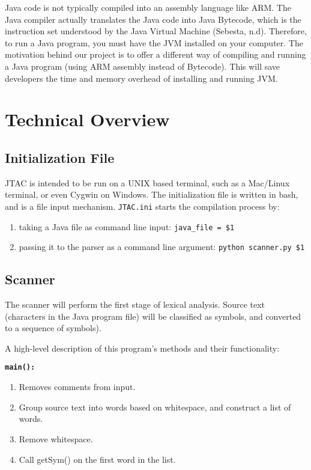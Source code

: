 \documentclass[11pt]{article}
\begin{document}
\bigskip
Java code is not typically compiled into an assembly language like ARM. The Java compiler actually translates the Java code into Java Bytecode, which is the instruction set understood by the Java Virtual Machine  (Sebesta, n.d). Therefore, to run a Java program, you must have the JVM installed on your computer. The motivation behind our project is to offer a different way of compiling and running a Java program (using ARM assembly instead of Bytecode). This will save developers the time and memory overhead of installing and running JVM.


\section{Technical Overview}

\subsection{Initialization File}

\justifying

JTAC is intended to be run on a UNIX based terminal, such as a Mac/Linux terminal, or even Cygwin on Windows. The initialization file is written in bash, and is a file input mechanism. {\tt JTAC.ini} starts the compilation process by:

\begin{enumerate}[label=\alph*)]
	\item taking a Java file as command line input: {\tt java\_file~=~\$1}
	\item passing it to the parser as a command line argument: {\tt python scanner.py \$1 }
\end{enumerate}

\subsection{Scanner}

The scanner will perform the first stage of lexical analysis. Source text (characters in the Java program file) will be classified as symbols, and converted to a sequence of symbols).

\bigskip
A high-level description of this program’s methods and their functionality:

\bigskip
\textbf{\tt main():}

\begin{enumerate}[label=\alph*)]
	\item Removes comments from input. 
	\item Group source text into words based on whitespace, and construct a list of words.
	\item Remove whitespace.
	\item Call getSym() on the first word in the list.
\end{enumerate}
\end{document}
